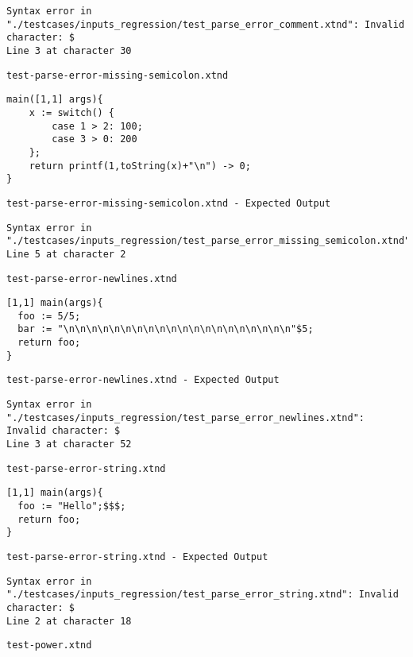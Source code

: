 \begin{lstlisting}
Syntax error in "./testcases/inputs_regression/test_parse_error_comment.xtnd": Invalid character: $
Line 3 at character 30
\end{lstlisting}


\medskip \noindent \texttt{test-parse-error-missing-semicolon.xtnd}


\begin{lstlisting}
main([1,1] args){
	x := switch() {
		case 1 > 2: 100;
		case 3 > 0: 200
	};
	return printf(1,toString(x)+"\n") -> 0;
}
\end{lstlisting}


\medskip \noindent \texttt{test-parse-error-missing-semicolon.xtnd - Expected Output}


\begin{lstlisting}
Syntax error in "./testcases/inputs_regression/test_parse_error_missing_semicolon.xtnd": 
Line 5 at character 2
\end{lstlisting}


\medskip \noindent \texttt{test-parse-error-newlines.xtnd}


\begin{lstlisting}
[1,1] main(args){
  foo := 5/5;
  bar := "\n\n\n\n\n\n\n\n\n\n\n\n\n\n\n\n\n\n\n\n"$5;
  return foo;
}
\end{lstlisting}


\medskip \noindent \texttt{test-parse-error-newlines.xtnd - Expected Output}


\begin{lstlisting}
Syntax error in "./testcases/inputs_regression/test_parse_error_newlines.xtnd": Invalid character: $
Line 3 at character 52
\end{lstlisting}


\medskip \noindent \texttt{test-parse-error-string.xtnd}


\begin{lstlisting}
[1,1] main(args){
  foo := "Hello";$$$;
  return foo;
}
\end{lstlisting}


\medskip \noindent \texttt{test-parse-error-string.xtnd - Expected Output}


\begin{lstlisting}
Syntax error in "./testcases/inputs_regression/test_parse_error_string.xtnd": Invalid character: $
Line 2 at character 18
\end{lstlisting}


\medskip \noindent \texttt{test-power.xtnd}


